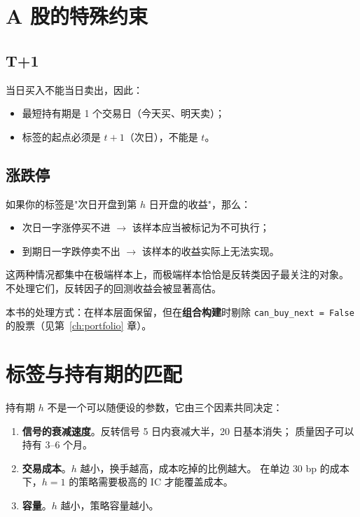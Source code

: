 \section{A 股的特殊约束}

\subsection{T+1}

当日买入不能当日卖出，因此：
\begin{itemize}
  \item 最短持有期是 1 个交易日（今天买、明天卖）；
  \item 标签的起点必须是 $t+1$（次日），不能是 $t$。
\end{itemize}

\subsection{涨跌停}

如果你的标签是"次日开盘到第 $h$ 日开盘的收益"，那么：
\begin{itemize}
  \item 次日一字涨停买不进 $\rightarrow$ 该样本应当被标记为不可执行；
  \item 到期日一字跌停卖不出 $\rightarrow$ 该样本的收益实际上无法实现。
\end{itemize}

这两种情况都集中在极端样本上，而极端样本恰恰是反转类因子最关注的对象。
不处理它们，反转因子的回测收益会被显著高估。

本书的处理方式：在样本层面保留，但在\textbf{组合构建}时剔除
\texttt{can\_buy\_next = False} 的股票（见第~\ref{ch:portfolio} 章）。

\section{标签与持有期的匹配}

持有期 $h$ 不是一个可以随便设的参数，它由三个因素共同决定：

\begin{enumerate}
  \item \textbf{信号的衰减速度}。反转信号 5 日内衰减大半，20 日基本消失；
        质量因子可以持有 3--6 个月。
  \item \textbf{交易成本}。$h$ 越小，换手越高，成本吃掉的比例越大。
        在单边 $30$ bp 的成本下，$h=1$ 的策略需要极高的 IC 才能覆盖成本。
  \item \textbf{容量}。$h$ 越小，策略容量越小。
\end{enumerate}

